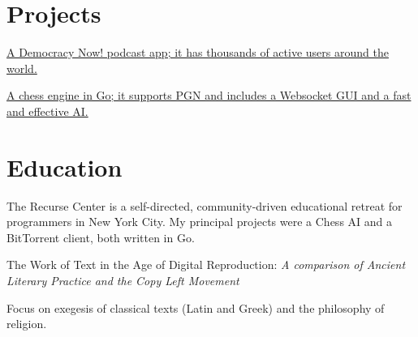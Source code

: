 \documentclass[]{deedy-resume-openfont}
\begin{document}
\section{Projects}
\vspace{\topsep} %
\href{https://play.google.com/store/apps/details?id=com.workingagenda.democracydroid}{A Democracy Now! podcast app; it has thousands of active users around the world.}
\sectionsep

\href{https://ghess-chess.herokuapp.com/}{A chess engine in Go; it supports PGN and includes a Websocket GUI and a fast and effective AI.}
\sectionsep




\section{Education}
\vspace{\topsep} %
The Recurse Center is a self-directed, community-driven educational retreat for programmers in New York City.\newline
My principal projects were a Chess AI and a BitTorrent client, both written in Go.
\sectionsep


The Work of Text in the Age of Digital Reproduction:
\textit{A comparison of Ancient Literary Practice and the Copy Left Movement}
\sectionsep %

Focus on exegesis of classical texts (Latin and Greek) and the philosophy of religion.
\sectionsep
\end{document}
